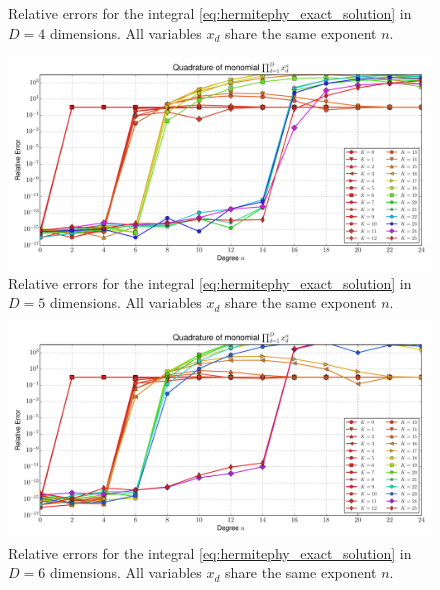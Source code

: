 \documentclass[a4paper,10pt]{article}
\begin{document}
\begin{subfigures}
\begin{figure}
    \caption{Relative errors for the integral \eqref{eq:hermitephy_exact_solution}
    in $D=4$ dimensions. All variables $x_d$ share the same exponent $n$.}
    \label{fig:monomial_errors_hermitephy_multivariate_dimension_4}
  \end{figure}
  \begin{figure}\centering
    \includegraphics[width=\linewidth]{./img/monomial_errors_hermitephy_multivariate_dimension_5.pdf}
    \caption{Relative errors for the integral \eqref{eq:hermitephy_exact_solution}
    in $D=5$ dimensions. All variables $x_d$ share the same exponent $n$.}
    \label{fig:monomial_errors_hermitephy_multivariate_dimension_5}
  \end{figure}
  \begin{figure}\centering
    \includegraphics[width=\linewidth]{./img/monomial_errors_hermitephy_multivariate_dimension_6.pdf}
    \caption{Relative errors for the integral \eqref{eq:hermitephy_exact_solution}
    in $D=6$ dimensions. All variables $x_d$ share the same exponent $n$.}
    \label{fig:monomial_errors_hermitephy_multivariate_dimension_6}
  \end{figure}
  \label{fig:monomial_errors_hermitephy_multivariate}
\end{subfigures}
\end{document}
